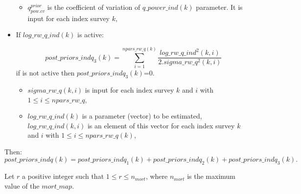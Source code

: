 \documentclass{article}
\begin{document}
\begin{itemize}
\begin{itemize}
    \item $q^{prior}_{pow.cv}$ is the coefficient of variation of $q\_power\_ind(k)$ parameter. It is input for each index survey $k$,

    \end{itemize}
    
    \item If $log\_rw\_q\_ind(k)$ is active:
    
    \begin{equation}
        post\_priors\_indq_3(k) = \sum_{i=1}^{npars\_rw\_q(k)}\dfrac{log\_rw\_q\_ind^2(k,i)}{2.sigma\_rw\_q^2(k,i)}
    \end{equation}
    if is not active then $post\_priors\_indq_3(k)$=0.
    \begin{itemize}
    
    \item $sigma\_rw\_q(k,i)$ is input for each index survey $k$ and $i$ with $1\leq i \leq npars\_rw\_q$,
    \item $log\_rw\_q\_ind(k)$ is a parameter (vector) to be estimated, $log\_rw\_q\_ind(k,i)$ is an element of this vector for each index survey $k$ and $i$ with $1\leq i \leq npars\_rw\_q(k)$,
    \end{itemize}
        
    \end{itemize}

    Then: 
    \begin{equation}
    post\_priors\_indq(k)=post\_priors\_indq_1(k)+post\_priors\_indq_2(k)+ post\_priors\_indq_3(k).
    \end{equation}

Let $r$ a positive integer such that $1\leq r \leq n_{mort}$, where $n_{mort}$ is the maximum value of the $mort\_map$.
\end{document}

